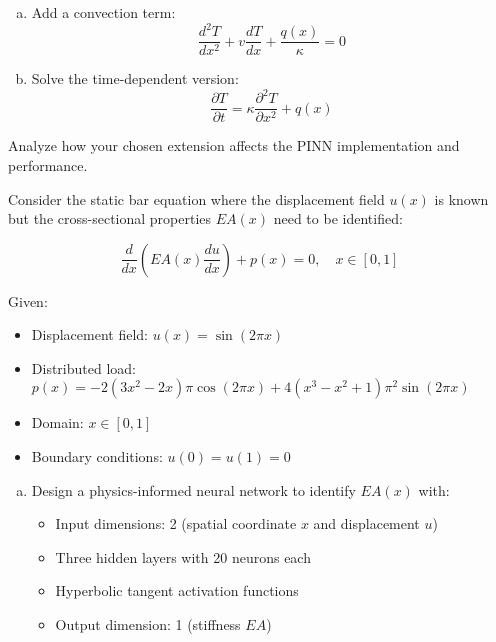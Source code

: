 \begin{problemset}
\begin{problem}
\begin{enumerate}[a)]
\item Add a convection term:
    \begin{equation*}
    \frac{d^2T}{dx^2} + v\frac{dT}{dx} + \frac{q(x)}{\kappa} = 0
    \end{equation*}

\item Solve the time-dependent version:
    \begin{equation*}
    \frac{\partial T}{\partial t} = \kappa\frac{\partial^2 T}{\partial x^2} + q(x)
    \end{equation*}
\end{enumerate}

Analyze how your chosen extension affects the PINN implementation and performance.
\end{problem}

\begin{problem}
Consider the static bar equation where the displacement field $u(x)$ is known but the cross-sectional properties $EA(x)$ need to be identified:

\begin{equation*}
\frac{d}{dx}(EA(x)\frac{du}{dx}) + p(x) = 0, \quad x \in [0,1]
\end{equation*}

Given:
\begin{itemize}
\item Displacement field: $u(x) = \sin(2\pi x)$
\item Distributed load: $p(x) = -2(3x^2 - 2x)\pi \cos(2\pi x) + 4(x^3 - x^2 + 1)\pi^2 \sin(2\pi x)$
\item Domain: $x \in [0,1]$
\item Boundary conditions: $u(0) = u(1) = 0$
\end{itemize}

\begin{enumerate}[a)]
\item Design a physics-informed neural network to identify $EA(x)$ with:
    \begin{itemize}
    \item Input dimensions: 2 (spatial coordinate $x$ and displacement $u$)
    \item Three hidden layers with 20 neurons each
    \item Hyperbolic tangent activation functions
    \item Output dimension: 1 (stiffness $EA$)
    \end{itemize}


\end{enumerate}
\end{problem}
\end{problemset}
